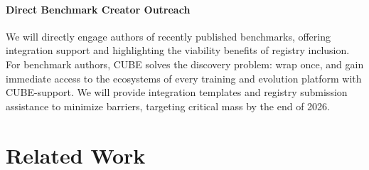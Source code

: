 \documentclass{article}
\theoremstyle{plain}
\theoremstyle{definition}
\theoremstyle{remark}
\begin{document}
\paragraph{Direct Benchmark Creator Outreach}
We will directly engage authors of recently published benchmarks, offering integration support and highlighting the viability benefits of registry inclusion. For benchmark authors, CUBE solves the discovery problem: wrap once, and gain immediate access to the ecosystems of every training and evolution platform with CUBE-support. We will provide integration templates and registry submission assistance to minimize barriers, targeting critical mass by the end of 2026.

\section{Related Work}
\label{sec:related}
\end{document}
